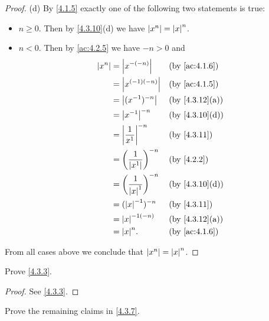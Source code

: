 \begin{proof}{(d)}
  By \cref{4.1.5} exactly one of the following two statements is true:
  \begin{itemize}
    \item \(n \geq 0\).
          Then by \cref{4.3.10}(d) we have \(\left\lvert x^n\right\rvert = \left\lvert x\right\rvert^n\).
    \item \(n < 0\).
          Then by \cref{ac:4.2.5} we have \(-n > 0\) and
          \begin{align*}
            \abs{x^n} & = \abs{x^{-(-n)}}                       &  & \by{ac:4.1.6}                \\
                      & = \abs{x^{(-1)(-n)}}                    &  & \by{ac:4.1.5}                \\
                      & = \abs{(x^{-1})^{-n}}                   &  & \text{(by \cref{4.3.12}(a))} \\
                      & = \abs{x^{-1}}^{-n}                     &  & \text{(by \cref{4.3.10}(d))} \\
                      & = \abs{\dfrac{1}{x^1}}^{-n}             &  & \by{4.3.11}                  \\
                      & = \bigg(\dfrac{1}{\abs{x^1}}\bigg)^{-n} &  & \by{4.2.2}                   \\
                      & = \bigg(\dfrac{1}{\abs{x}^1}\bigg)^{-n} &  & \text{(by \cref{4.3.10}(d))} \\
                      & = (\abs{x}^{-1})^{-n}                   &  & \by{4.3.11}                  \\
                      & = \abs{x}^{-1(-n)}                      &  & \text{(by \cref{4.3.12}(a))} \\
                      & = \abs{x}^n.                            &  & \by{ac:4.1.6}
          \end{align*}
  \end{itemize}
  From all cases above we conclude that \(\left\lvert x^n\right\rvert = \left\lvert x\right\rvert^n\).
\end{proof}

\exercisesection

\begin{ex}\label{ex:4.3.1}
  Prove \cref{4.3.3}.
\end{ex}

\begin{proof}
  See \cref{4.3.3}.
\end{proof}

\begin{ex}\label{ex:4.3.2}
  Prove the remaining claims in \cref{4.3.7}.
\end{ex}

